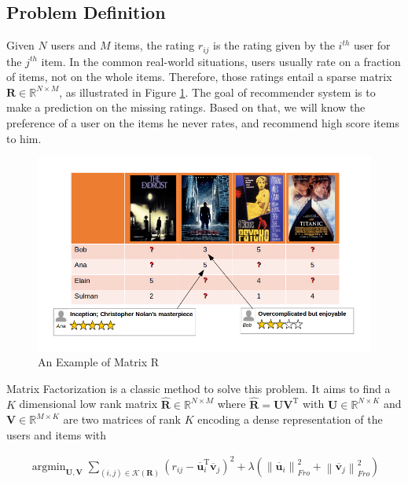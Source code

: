 \documentclass{sig-alternate-05-2015}
\DeclareMathOperator*{\argmin}{argmin}
\begin{document}
\subsection{Problem Definition}
Given $N$ users and $M$ items, the rating $r_{ij}$ is the rating given by
the $i^{th}$ user for the $j^{th}$ item.
In the common real-world situations,
users usually rate on a fraction of items, not on the whole items.
Therefore,
those ratings entail a sparse matrix $\mathbf{R} \in \mathbb{R}^{N \times M}$,
as illustrated in Figure \ref{fig:matrix}.
The goal of recommender system is to make a prediction on the missing ratings.
Based on that, we will know the preference of a user on the items he never rates,
and recommend high score items to him.

\begin{figure}[htbp]
	\centering
	\includegraphics[scale=0.4]{images/4.png}
	\caption{An Example of Matrix R}
	\label{fig:matrix}
\end{figure}

Matrix Factorization is a classic method to solve this problem.
It aims to find a $K$ dimensional low rank matrix $\mathbf{\hat{R}} \in \mathbb{R}^{N \times M}$
where $\mathbf{\hat{R}} = \mathbf{U} \mathbf{V}^\mathrm{T}$ with
$\mathbf{U} \in \mathbb{R}^{N \times K}$ and $\mathbf{V} \in \mathbb{R}^{M \times K}$
are two matrices of rank $K$ encoding a dense representation of the users and items with

\begin{equation}
\begin{aligned}
	\argmin_{\mathbf{U},\mathbf{V}}
	\sum_{(i,j) \in \mathcal{K}(\mathbf{R})}
	( r_{ij} - \overline{\mathbf{u}}_i^{\mathrm{T}} \overline{\mathbf{v}}_j ) ^ 2 +
	\lambda ( \left\| \overline{\mathbf{u}}_i \right\|_{Fro}^2 +
	\left\| \overline{\mathbf{v}}_j \right\|_{Fro}^2 )
\end{aligned}
\end{equation}
\end{document}

